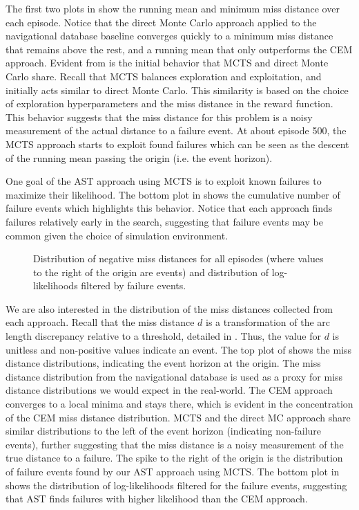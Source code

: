 The first two plots in  show the running mean and minimum miss distance over each episode.
Notice that the direct Monte Carlo approach applied to the navigational database baseline converges quickly to a minimum miss distance that remains above the rest, and a running mean that only outperforms the CEM approach.
% 
Evident from  is the initial behavior that MCTS and direct Monte Carlo share.
Recall that MCTS balances exploration and exploitation, and initially acts similar to direct Monte Carlo.
This similarity is based on the choice of exploration hyperparameters and the miss distance in the reward function.
This behavior suggests that the miss distance for this problem is a noisy measurement of the actual distance to a failure event.
At about episode 500, the MCTS approach starts to exploit found failures which can be seen as the descent of the running mean passing the origin (i.e. the event horizon).


One goal of the AST approach using MCTS is to exploit known failures to maximize their likelihood.
The bottom plot in  shows the cumulative number of failure events which highlights this behavior.
Notice that each approach finds failures relatively early in the search, suggesting that failure events may be common given the choice of simulation environment.


\begin{figure}[ht!]
\centering
\resizebox{0.79\columnwidth}{!}{}
\caption{Distribution of negative miss distances for all episodes (where values to the right of the origin are events) and distribution of log-likelihoods filtered by failure events.}
\label{fig:distributions}
\end{figure}

We are also interested in the distribution of the miss distances collected from each approach.
Recall that the miss distance $d$ is a transformation of the arc length discrepancy relative to a threshold, detailed in .
Thus, the value for $d$ is unitless and non-positive values indicate an event.
The top plot of  shows the miss distance distributions, indicating the event horizon at the origin.
The miss distance distribution from the navigational database is used as a proxy for miss distance distributions we would expect in the real-world.
The CEM approach converges to a local minima and stays there, which is evident in the concentration of the CEM miss distance distribution.
MCTS and the direct MC approach share similar distributions to the left of the event horizon (indicating non-failure events), further suggesting that the miss distance is a noisy measurement of the true distance to a failure.
The spike to the right of the origin is the distribution of failure events found by our AST approach using MCTS.
The bottom plot in  shows the distribution of log-likelihoods filtered for the failure events, suggesting that AST finds failures with higher likelihood than the CEM approach.



